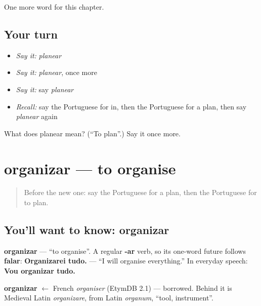 \begin{grammarlens}[title={What you've built}]
One more word for this chapter.
\end{grammarlens}

\subsection*{Your turn}
\begin{itemize}
\raggedright
  \item \emph{Say it:} \emph{planear}
  \item \emph{Say it:} \emph{planear}, once more
  \item \emph{Say it:} say \emph{planear}
  \item \emph{Recall:} say the Portuguese for in, then the Portuguese for a plan, then say \emph{planear} again
\end{itemize}

\begin{tcolorbox}[breakable,colback=teal!4,colframe=teal!35!black,title={Before you move on}]
What does planear mean? (\textquotedblleft{}To plan\textquotedblright{}.) Say it once more.
\end{tcolorbox}
\section[organizar]{organizar — to organise}

\label{lesson:PT-C136-organizar}



\begin{quote}
Before the new one: say the Portuguese for a plan, then the Portuguese for to plan.
\end{quote}

\subsection*{You'll want to know: organizar}
\textbf{organizar} — \textquotedblleft{}to organise\textquotedblright{}. A regular \textbf{-ar} verb, so its one-word future follows \textbf{falar}: \textbf{Organizarei tudo.} — \textquotedblleft{}I will organise everything.\textquotedblright{} In everyday speech: \textbf{Vou organizar tudo.}

\begin{cousinweb}
\textbf{organizar} $\leftarrow$ French \emph{organiser} (EtymDB 2.1) — borrowed. Behind it is Medieval Latin \emph{organizare}, from Latin \emph{organum}, \textquotedblleft{}tool, instrument\textquotedblright{}.
\end{cousinweb}

